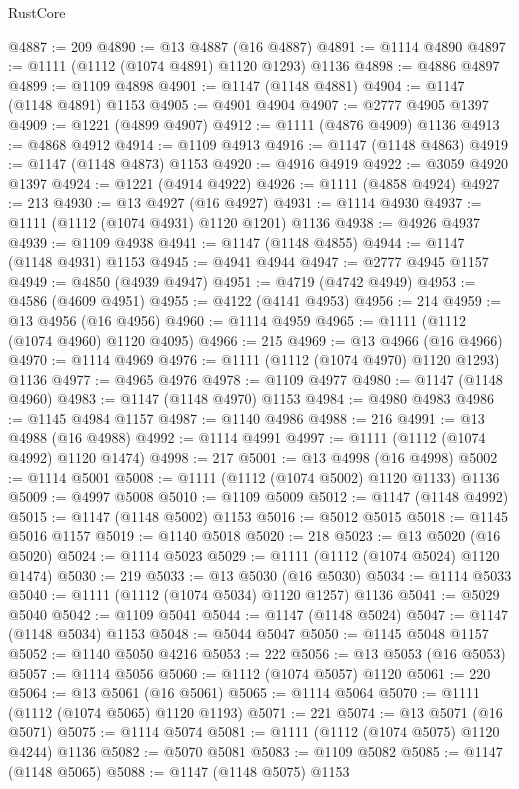 \begin{lexlean}{RustCore}
\begin{coremodule}
@4887 := 209
@4890 := @13 @4887 (@16 @4887)
@4891 := @1114 @4890
@4897 := @1111 (@1112 (@1074 @4891) @1120 @1293) @1136
@4898 := @4886 @4897
@4899 := @1109 @4898
@4901 := @1147 (@1148 @4881)
@4904 := @1147 (@1148 @4891) @1153
@4905 := @4901 @4904
@4907 := @2777 @4905 @1397
@4909 := @1221 (@4899 @4907)
@4912 := @1111 (@4876 @4909) @1136
@4913 := @4868 @4912
@4914 := @1109 @4913
@4916 := @1147 (@1148 @4863)
@4919 := @1147 (@1148 @4873) @1153
@4920 := @4916 @4919
@4922 := @3059 @4920 @1397
@4924 := @1221 (@4914 @4922)
@4926 := @1111 (@4858 @4924)
@4927 := 213
@4930 := @13 @4927 (@16 @4927)
@4931 := @1114 @4930
@4937 := @1111 (@1112 (@1074 @4931) @1120 @1201) @1136
@4938 := @4926 @4937
@4939 := @1109 @4938
@4941 := @1147 (@1148 @4855)
@4944 := @1147 (@1148 @4931) @1153
@4945 := @4941 @4944
@4947 := @2777 @4945 @1157
@4949 := @4850 (@4939 @4947)
@4951 := @4719 (@4742 @4949)
@4953 := @4586 (@4609 @4951)
@4955 := @4122 (@4141 @4953)
@4956 := 214
@4959 := @13 @4956 (@16 @4956)
@4960 := @1114 @4959
@4965 := @1111 (@1112 (@1074 @4960) @1120 @4095)
@4966 := 215
@4969 := @13 @4966 (@16 @4966)
@4970 := @1114 @4969
@4976 := @1111 (@1112 (@1074 @4970) @1120 @1293) @1136
@4977 := @4965 @4976
@4978 := @1109 @4977
@4980 := @1147 (@1148 @4960)
@4983 := @1147 (@1148 @4970) @1153
@4984 := @4980 @4983
@4986 := @1145 @4984 @1157
@4987 := @1140 @4986
@4988 := 216
@4991 := @13 @4988 (@16 @4988)
@4992 := @1114 @4991
@4997 := @1111 (@1112 (@1074 @4992) @1120 @1474)
@4998 := 217
@5001 := @13 @4998 (@16 @4998)
@5002 := @1114 @5001
@5008 := @1111 (@1112 (@1074 @5002) @1120 @1133) @1136
@5009 := @4997 @5008
@5010 := @1109 @5009
@5012 := @1147 (@1148 @4992)
@5015 := @1147 (@1148 @5002) @1153
@5016 := @5012 @5015
@5018 := @1145 @5016 @1157
@5019 := @1140 @5018
@5020 := 218
@5023 := @13 @5020 (@16 @5020)
@5024 := @1114 @5023
@5029 := @1111 (@1112 (@1074 @5024) @1120 @1474)
@5030 := 219
@5033 := @13 @5030 (@16 @5030)
@5034 := @1114 @5033
@5040 := @1111 (@1112 (@1074 @5034) @1120 @1257) @1136
@5041 := @5029 @5040
@5042 := @1109 @5041
@5044 := @1147 (@1148 @5024)
@5047 := @1147 (@1148 @5034) @1153
@5048 := @5044 @5047
@5050 := @1145 @5048 @1157
@5052 := @1140 @5050 @4216
@5053 := 222
@5056 := @13 @5053 (@16 @5053)
@5057 := @1114 @5056
@5060 := @1112 (@1074 @5057) @1120
@5061 := 220
@5064 := @13 @5061 (@16 @5061)
@5065 := @1114 @5064
@5070 := @1111 (@1112 (@1074 @5065) @1120 @1193)
@5071 := 221
@5074 := @13 @5071 (@16 @5071)
@5075 := @1114 @5074
@5081 := @1111 (@1112 (@1074 @5075) @1120 @4244) @1136
@5082 := @5070 @5081
@5083 := @1109 @5082
@5085 := @1147 (@1148 @5065)
@5088 := @1147 (@1148 @5075) @1153

\end{coremodule}
\end{lexlean}
